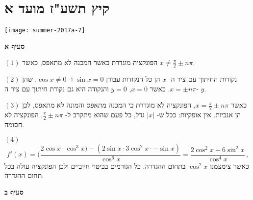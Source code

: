 
\section{קיץ תשע"ז מועד א}

\begin{center}
\texttt{[image: summer-2017a-7]}
\end{center}

\vspace{-2ex}

\textbf{סעיף א}

$(1)$
הפונקציה מוגדרת כאשר המכנה לא מתאפס, כאשר 
$x \neq \frac{\pi}{2} \pm n\pi$.

$(2)$
נקודות החיתוך עם ציר ה-%
$x$
הן כל הנקודות עבורן
$\sin x = 0$
ו-%
$\cos x \neq 0$,
שהן 
$x=\pm n\pi$.
כאשר 
$x=0$,
$y=0$
והנקודה היא גם נקודת חיתוך עם ציר ה-%
$y$.

$(3)$
כאשר
$x=\frac{\pi}{2} \pm n\pi$,
הפונקציה לא מוגדרת כי המכנה מתאפס והמונה לא מתאפס, לכן הן 
\asms{}
אנכיות. אין 
\asm{}
אופקיות: ככל ש-%
$|x|$
גדל, כל פעם שהוא מתקרב ל-%
$\frac{\pi}{2} \pm n\pi$,
הפונקציה לא חסומה.

$(4)$
\[
f'(x)=(\frac{2\cos x\cdot\cos^3 x) - (2\sin x \cdot 3\cos^2 x \cdot -\sin x)}{\cos^6 x}=\frac{2\cos^2 x + 6\sin^2 x}{\cos^4 x}\,,
\]
כאשר צימצמנו 
$\cos^2 x$
בתחום ההגדרה. כל הגורמים בביטוי חיוביים ולכן הפונקציה עולה בכל תחום ההגדרה.

\np

\textbf{סעיף ב}

\begin{center}
\end{center}


